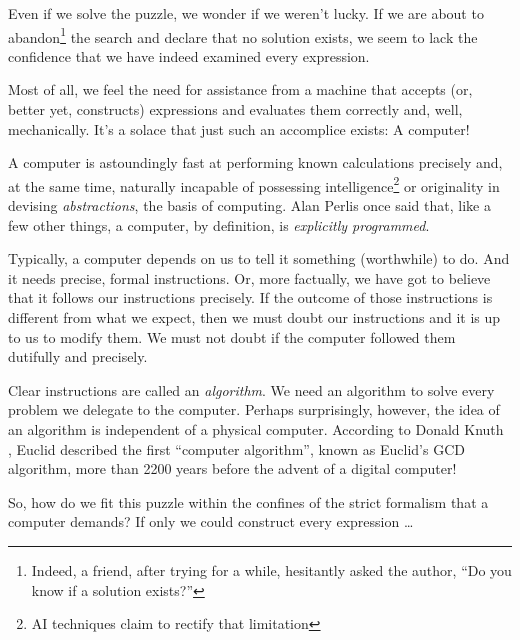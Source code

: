 \documentclass{resonance}
\begin{document}
Even if we solve the puzzle, we wonder if we weren't lucky. If we are about to abandon\footnote{Indeed, a friend, after trying for a while, hesitantly asked the author, ``Do you know if a solution exists?''} the search and declare that no solution exists, we seem to lack the confidence that we have indeed examined every expression. 

Most of all, we feel the need for assistance from a machine that accepts (or, better yet, constructs) expressions and evaluates them correctly and, well, mechanically. It's a solace that just such an accomplice exists: A computer! 

A computer is astoundingly fast at performing known calculations precisely and, at the same time, naturally incapable of possessing intelligence\footnote{AI techniques claim to rectify that limitation} or originality in devising \emph{abstractions}, the basis of computing. Alan Perlis once said \cite{Perlis1984} that, like a few other things, a computer, by definition, is \emph{explicitly programmed}. 

Typically, a computer depends on us to tell it something (worthwhile) to do. And it needs precise, formal instructions. Or, more factually, we have got to believe that it follows our instructions precisely. If the outcome of those instructions is different from what we expect, then we must doubt our instructions and it is up to us to modify them. We must not doubt if the computer followed them dutifully and precisely. 

Clear instructions are called an \emph{algorithm}. We need an algorithm to solve every problem we delegate to the computer. Perhaps surprisingly, however, the idea of an algorithm is independent of a physical computer. According to Donald Knuth \cite{Knuth1997}, Euclid described the first ``computer algorithm'', known as Euclid's GCD algorithm, more than 2200 years before the advent of a digital computer!

So, how do we fit this puzzle within the confines of the strict formalism that a computer demands? If only we could construct every expression \dots

\end{document}
